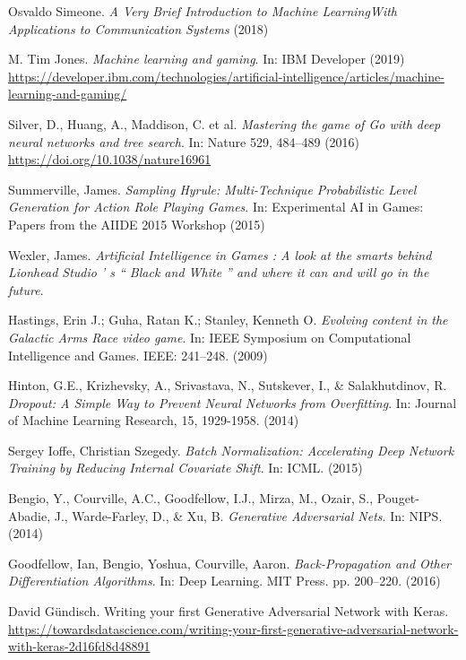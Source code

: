\begin{thebibliography}{9}
 Osvaldo Simeone. \textit{A Very Brief Introduction to Machine LearningWith Applications to Communication Systems} (2018)

 M. Tim Jones. \textit{Machine learning and gaming}. In: IBM Developer (2019)\\
\href{https://developer.ibm.com/technologies/artificial-intelligence/articles/machine-learning-and-gaming/}{https://developer.ibm.com/technologies/artificial-intelligence/articles/machine-learning-and-gaming/}

 Silver, D., Huang, A., Maddison, C. et al. \textit{Mastering the game of Go with deep neural networks and tree search}. In: Nature 529, 484–489 (2016)\\
\href{https://doi.org/10.1038/nature16961}{https://doi.org/10.1038/nature16961}

 Summerville, James. \textit{Sampling Hyrule: Multi-Technique Probabilistic Level Generation for Action Role Playing Games}. In: Experimental AI in Games: Papers from the AIIDE 2015 Workshop (2015)

Wexler, James. \textit{Artificial Intelligence in Games : A look at the smarts behind Lionhead Studio ’ s “ Black and White ” and where it can and will go in the future}.

Hastings, Erin J.; Guha, Ratan K.; Stanley, Kenneth O. \textit{Evolving content in the Galactic Arms Race video game}. In: IEEE Symposium on Computational Intelligence and Games. IEEE: 241–248. (2009)

 Hinton, G.E., Krizhevsky, A., Srivastava, N., Sutskever, I., \& Salakhutdinov, R. \textit{Dropout:  A Simple Way to Prevent Neural Networks from Overfitting}. In: Journal of Machine Learning Research, 15, 1929-1958. (2014)

 Sergey Ioffe, Christian Szegedy. \textit{Batch Normalization: Accelerating Deep Network Training by Reducing Internal Covariate Shift}. In: ICML. (2015)

 Bengio, Y., Courville, A.C., Goodfellow, I.J., Mirza, M., Ozair, S., Pouget-Abadie, J., Warde-Farley, D., \& Xu, B. \textit{Generative Adversarial Nets}. In: NIPS. (2014)

 Goodfellow, Ian, Bengio, Yoshua, Courville, Aaron. \textit{Back-Propagation and Other Differentiation Algorithms}. In: Deep Learning. MIT Press. pp. 200–220. (2016)

 David Gündisch. Writing your first Generative Adversarial Network with Keras.
\href{https://towardsdatascience.com/writing-your-first-generative-adversarial-network-with-keras-2d16fd8d48891}{https://towardsdatascience.com/writing-your-first-generative-adversarial-network-with-keras-2d16fd8d48891}


\end{thebibliography}
